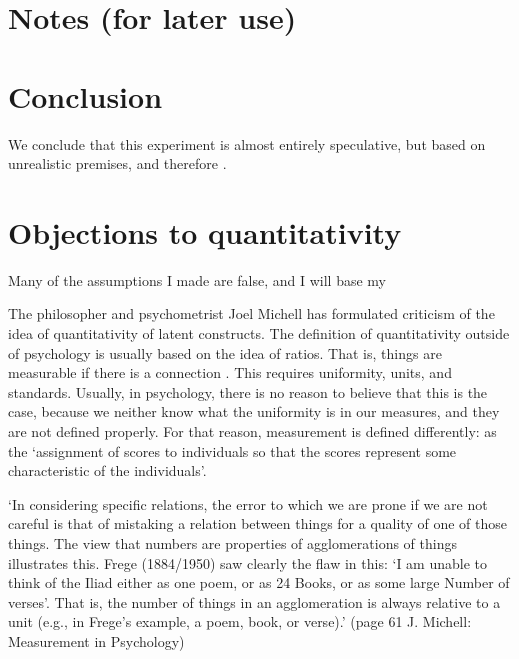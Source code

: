 \documentclass[utf8]{FrontiersinVancouver}
\begin{document}


\section{Notes (for later use)}

\section{Conclusion}
We conclude that this experiment is almost entirely speculative, but based on unrealistic premises, and therefore .
\section{Objections to quantitativity}
Many of the assumptions I made are false, and I will base my 

The philosopher and psychometrist Joel Michell has formulated criticism of the idea of quantitativity of latent constructs. The definition of quantitativity outside of psychology is usually based on the idea of ratios. That is, things are measurable if there is a connection . This requires uniformity, units, and standards. Usually, in psychology, there is no reason to believe that this is the case, because we neither know what the uniformity is in our measures, and they are not defined properly. For that reason, measurement is defined differently: as the `assignment of scores to individuals so that the scores represent some characteristic of the individuals'. 

    `In considering specific relations, the error to which we are prone if we are not careful is that of mistaking a relation between things for a quality of one of those things. The view that numbers are properties of agglomerations of things illustrates this. Frege (1884/1950) saw clearly the flaw in this: `I am unable to think of the Iliad either as one poem, or as 24 Books, or as some large Number of verses'. That is, the number of things in an agglomeration is always relative to a unit (e.g., in Frege's example, a poem, book, or verse).' (page 61 J. Michell: Measurement in Psychology)
\end{document}
